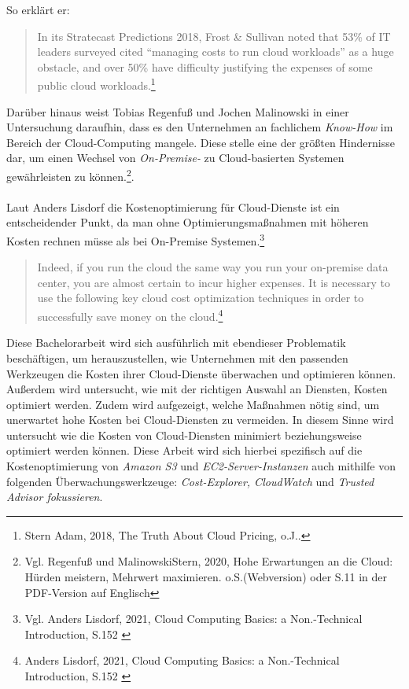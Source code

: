 So erklärt er:
\begin{quote}    
    In its Stratecast Predictions 2018, Frost \& Sullivan noted that 53\% of IT leaders surveyed cited “managing costs to run cloud workloads” as a huge obstacle, and over 50\% have difficulty justifying the expenses of some public cloud workloads.\footnote{Stern Adam, 2018, The Truth About Cloud Pricing, o.J.\cite{SP1}.}
\end{quote}
Darüber hinaus weist Tobias Regenfuß und Jochen Malinowski in einer Untersuchung daraufhin, dass es den Unternehmen an fachlichem \textit{Know-How} im Bereich der Cloud-Computing mangele. Diese stelle eine der größten Hindernisse dar, um einen Wechsel von \textit{On-Premise-} zu Cloud-basierten Systemen gewährleisten zu können.\footnote{Vgl. Regenfuß und MalinowskiStern, 2020, Hohe Erwartungen an die Cloud: Hürden meistern, Mehrwert maximieren. o.S.(Webversion) oder S.11 in der PDF-Version auf Englisch\cite{ACC1}}.
\\\\
Laut Anders Lisdorf die Kostenoptimierung für Cloud-Dienste ist ein entscheidender Punkt, da man ohne Optimierungsmaßnahmen mit höheren Kosten rechnen müsse als bei On-Premise Systemen.\footnote{Vgl. Anders Lisdorf, 2021, Cloud Computing Basics: a Non.-Technical Introduction, S.152 \cite{CCB}}
\begin{quote}
    Indeed, if you run the cloud the same way you run your on-premise data center, you are almost certain to incur higher expenses. It is necessary to use the following key cloud cost optimization techniques in order to successfully save money on the cloud.\footnote{Anders Lisdorf, 2021, Cloud Computing Basics: a Non.-Technical Introduction, S.152 \cite{CCB}}
\end{quote}
\begin{flushleft}
Diese Bachelorarbeit wird sich ausführlich mit ebendieser Problematik beschäftigen, um herauszustellen, wie Unternehmen mit den passenden Werkzeugen die Kosten ihrer Cloud-Dienste überwachen und optimieren können. %
Außerdem wird untersucht, wie mit der richtigen Auswahl an Diensten, Kosten optimiert werden. 
Zudem wird aufgezeigt, welche Maßnahmen nötig sind, um unerwartet hohe Kosten bei Cloud-Diensten zu vermeiden. In diesem Sinne wird untersucht %
wie die Kosten von Cloud-Diensten minimiert beziehungsweise optimiert werden können. Diese Arbeit wird sich hierbei spezifisch auf die Kostenoptimierung von \textit{Amazon S3} und \textit{EC2-Server-Instanzen} auch mithilfe von folgenden Überwachungswerkzeuge: \textit{Cost-Explorer, CloudWatch} und \textit{Trusted Advisor fokussieren}.
\end{flushleft}

